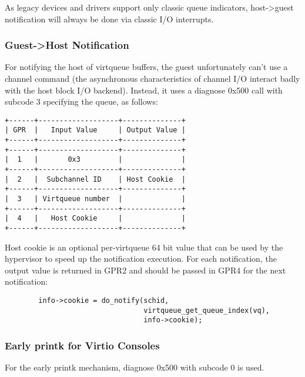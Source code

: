 As legacy devices and drivers support only classic queue indicators,
host->guest notification will always be done via classic I/O interrupts.

\subsubsection{Guest->Host Notification}\label{sec:Virtio Transport Options / Virtio over channel I/O / Device Operation / Guest->Host Notification}

For notifying the host of virtqueue buffers, the guest
unfortunately can't use a channel command (the asynchronous
characteristics of channel I/O interact badly with the host block
I/O backend). Instead, it uses a diagnose 0x500 call with subcode
3 specifying the queue, as follows:

\begin{verbatim}
+------+-------------------+--------------+
| GPR  |   Input Value     | Output Value |
+------+-------------------+--------------+
+------+-------------------+--------------+
|  1   |       0x3         |              |
+------+-------------------+--------------+
|  2   |  Subchannel ID    | Host Cookie  |
+------+-------------------+--------------+
|  3   | Virtqueue number  |              |
+------+-------------------+--------------+
|  4   |   Host Cookie     |              |
+------+-------------------+--------------+
\end{verbatim}

Host cookie is an optional per-virtqueue 64 bit value that can be
used by the hypervisor to speed up the notification execution.
For each notification, the output value is returned in GPR2 and
should be passed in GPR4 for the next notification:

\begin{lstlisting}
        info->cookie = do_notify(schid,
                                 virtqueue_get_queue_index(vq),
                                 info->cookie);
\end{lstlisting}

\subsubsection{Early printk for Virtio Consoles}\label{sec:Virtio Transport Options / Virtio over channel I/O / Device Operation / Early printk for Virtio Consoles}

For the early printk mechanism, diagnose 0x500 with subcode 0 is
used.

